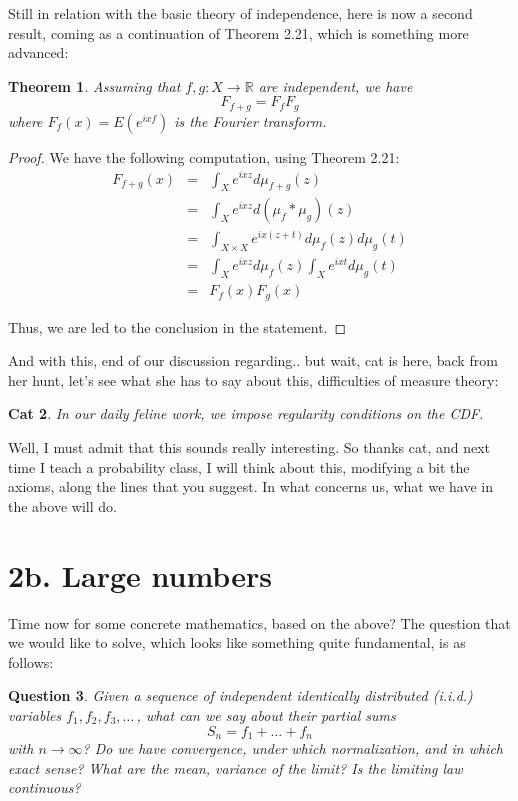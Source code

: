 \documentclass[12pt]{amsbook}
\newtheorem{theorem}{Theorem}[chapter]
\newtheorem{cat}[theorem]{Cat}
\newtheorem{question}[theorem]{Question}
\begin{document}
Still in relation with the basic theory of independence, here is now a second result, coming as a continuation of Theorem 2.21, which is something more advanced:


\begin{theorem}
Assuming that $f,g:X\to\mathbb R$ are independent, we have
$$F_{f+g}=F_fF_g$$
where $F_f(x)=E(e^{ixf})$ is the Fourier transform.
\end{theorem}

\begin{proof}
We have the following computation, using Theorem 2.21:
\begin{eqnarray*}
F_{f+g}(x)
&=&\int_Xe^{ixz}d\mu_{f+g}(z)\\
&=&\int_Xe^{ixz}d(\mu_f*\mu_g)(z)\\
&=&\int_{X\times X}e^{ix(z+t)}d\mu_f(z)d\mu_g(t)\\
&=&\int_Xe^{ixz}d\mu_f(z)\int_Xe^{ixt}d\mu_g(t)\\
&=&F_f(x)F_g(x)
\end{eqnarray*}

Thus, we are led to the conclusion in the statement.
\end{proof}

And with this, end of our discussion regarding.. but wait, cat is here, back from her hunt, let's see what she has to say about this, difficulties of measure theory:

\begin{cat}
In our daily feline work, we impose regularity conditions on the CDF.
\end{cat}

Well, I must admit that this sounds really interesting. So thanks cat, and next time I teach a probability class, I will think about this, modifying a bit the axioms, along the lines that you suggest. In what concerns us, what we have in the above will do.

\section*{2b. Large numbers}

Time now for some concrete mathematics, based on the above? The question that we would like to solve, which looks like something quite fundamental, is as follows:

\begin{question}
Given a sequence of independent identically distributed (i.i.d.) variables $f_1,f_2,f_3,\ldots\,$, what can we say about their partial sums
$$S_n=f_1+\ldots+f_n$$
with $n\to\infty$? Do we have convergence, under which normalization, and in which exact sense? What are the mean, variance of the limit? Is the limiting law continuous?
\end{question}
\end{document}
